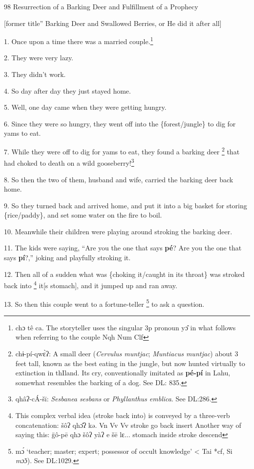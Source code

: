 
98 Resurrection of a Barking Deer and Fulfillment of a Prophecy

[former title'' Barking Deer and Swallowed Berries, or He did it after all]

1. Once upon a time there was a married couple.\footnote{chɔ  tê  ca. The storyteller uses the singular 3p pronoun yɔ̂ in what follows when referring to the couple  Nqh Num  Clf}

2. They were very lazy.

3. They didn't work.

4. So day after day they just stayed home.

5. Well, one day came when they were getting hungry.

6. Since they were so hungry, they went off into the \{forest/jungle\} to dig for
yams to eat.

7. While they were off to dig for yams to eat, they found a barking deer \footnote{chɨ-pí-qwɛ̀ʔ: A small deer (\textit{Cervulus muntjac}; \textit{Muntiacus muntjac}) about 3 feet tall, known as the best eating in the jungle, but now hunted virtually to extinction in thIland. Its cry, conventionally imitated as \textbf{pé-pí} in Lahu, somewhat resembles the barking of a dog. See DL: 835.} that
had choked to death on a wild gooseberry!\footnote{qhâʔ-cÁ-šī: \textit{Sesbanea sesbans }or \textit{Phyllanthus emblica}. See DL:286.}

8. So then the two of them, husband and wife, carried the barking deer back home.

9. So they turned back and arrived home, and put it into a big basket for storing
\{rice/paddy\}, and set some water on the fire to boil.

10. Meanwhile their children were playing around stroking the barking deer.

11. The kids were saying, ``Are you the one that says \textbf{pé}? Are you the
one that says \textbf{pí}?,'' joking and playfully stroking it.

12. Then all of a sudden what was \{choking it/caught in its throat\} was stroked
back into \footnote{This complex verbal idea (stroke back into) is conveyed by a three-verb concatenation: šôʔ       qhɔ̂ʔ      kə.  Vn       Vv        Vv  stroke go back insert  Another way of saying this: g̈ô-pē  qhɔ  šôʔ  yàʔ e šē lɛ...   stomach inside stroke descend} it[s stomach], and it jumped up and ran away.

13. So then this couple went to a fortune-teller \footnote{mɔ́ `teacher; master; expert; possessor of occult knowledge' < Tai *cf, Si \textit{mɔ̌ɔ}). See DL:1029.} to ask a question.

